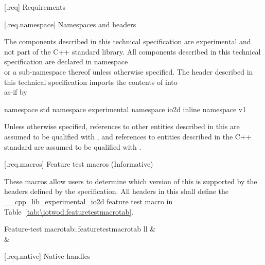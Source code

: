  [\iotwod.req] {Requirements}

 [\iotwod.req.namespace] {Namespaces and headers}

\pnum
The components described in this technical specification are experimental and 
not part of the C++ standard library. All components described in this 
technical specification are declared in namespace\\  or a sub-namespace thereof unless 
otherwise specified. The header described in this technical specification 
imports the contents of  into\\
 as-if by

\pnum
\begin{codeblock}
namespace std {
  namespace experimental {
    namespace io2d {
      inline namespace v1 { }
    }
  }
}
\end{codeblock}

\pnum
Unless otherwise specified, references to other entities described in this \documenttypename{} are assumed to be qualified with , and references to entities
described in the C++ standard are assumed to be qualified with .

 [\iotwod.req.macros] {Feature test macros (Informative)}

\pnum
These macros allow users to determine which version of this \documenttypename is supported by the headers deﬁned by the speciﬁcation. All headers in this \documenttypename shall deﬁne the __cpp_lib_experimental_io2d feature test macro in Table~\ref{tab:\iotwod.featuretestmacrotab}.

\begin{floattable}{Feature-test macro}{tab:\iotwod.featuretestmacrotab}
 {ll}
 \topline
  &  \\
 \capsep
  &  \\
\end{floattable}


%
%
 [\iotwod.req.native] {Native handles}

